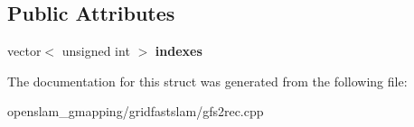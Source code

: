 \subsection*{Public Attributes}
\begin{DoxyCompactItemize}
\item 
\mbox{\label{structResampleRecord_af8fa9c4bc942316faf8376d9a58edf9f}} 
vector$<$ unsigned int $>$ {\bfseries indexes}
\end{DoxyCompactItemize}


The documentation for this struct was generated from the following file\+:\begin{DoxyCompactItemize}
\item 
openslam\+\_\+gmapping/gridfastslam/gfs2rec.\+cpp\end{DoxyCompactItemize}
